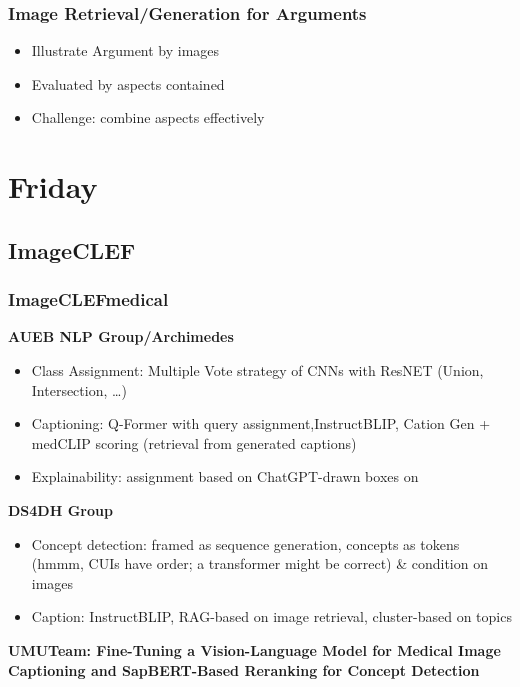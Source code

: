 \documentclass[a4paper]{article}
\begin{document}
\subsubsection{Image Retrieval/Generation for Arguments}
\begin{itemize}
    \item Illustrate Argument by images
    \item Evaluated by aspects contained
    \item Challenge: combine aspects effectively
\end{itemize}

\section{Friday}
\subsection{ImageCLEF}
\subsubsection{ImageCLEFmedical}
\textbf{AUEB NLP Group/Archimedes}
\begin{itemize}
    \item Class Assignment: Multiple Vote strategy of CNNs with ResNET (Union, Intersection, \dots)
    \item Captioning: Q-Former with query assignment,InstructBLIP, Cation Gen + medCLIP scoring (retrieval from generated captions)
    \item Explainability: assignment based on ChatGPT-drawn boxes on
\end{itemize}
\textbf{DS4DH Group}
\begin{itemize}
    \item Concept detection: framed as sequence generation, concepts as tokens (hmmm, CUIs have order; a transformer might be correct) \& condition on images
    \item Caption: InstructBLIP, RAG-based on image retrieval, cluster-based on topics
\end{itemize}
\textbf{UMUTeam: Fine-Tuning a Vision-Language Model for Medical Image Captioning and SapBERT-Based Reranking for Concept Detection}
\end{document}
